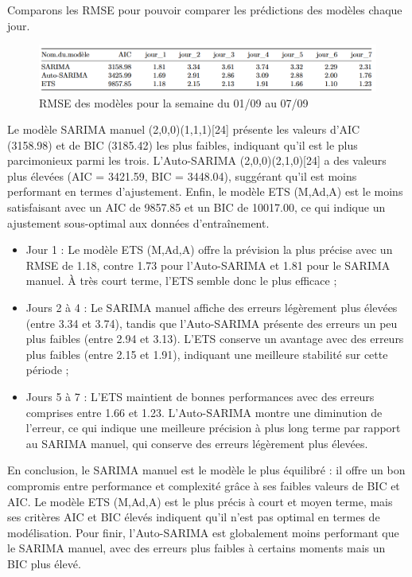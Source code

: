 \documentclass{article}
\theoremstyle{definition}
\theoremstyle{remark}
\begin{document}
\newpage
Comparons les RMSE pour pouvoir comparer les prédictions des modèles chaque jour.
\FloatBarrier
\begin{figure}[!h]
    \centering
    \includegraphics[width=1\linewidth]{fig20.png}
    \caption{RMSE des modèles pour la semaine du 01/09 au 07/09}
    \label{fig:enter-label}
\end{figure}
Le mod\`ele SARIMA manuel (2,0,0)(1,1,1)[24] pr\'esente les valeurs d'AIC (3158.98) et de BIC (3185.42) les plus faibles, indiquant qu'il est le plus parcimonieux parmi les trois. L'Auto-SARIMA (2,0,0)(2,1,0)[24] a des valeurs plus \'elev\'ees (AIC = 3421.59, BIC = 3448.04), sugg\'erant qu'il est moins performant en termes d'ajustement. Enfin, le mod\`ele ETS (M,Ad,A) est le moins satisfaisant avec un AIC de 9857.85 et un BIC de 10017.00, ce qui indique un ajustement sous-optimal aux donn\'ees d’entra\^inement.

\begin{itemize}
    \item Jour 1 : Le mod\`ele ETS (M,Ad,A) offre la pr\'evision la plus pr\'ecise avec un RMSE de 1.18, contre 1.73 pour l'Auto-SARIMA et 1.81 pour le SARIMA manuel. \`A tr\`es court terme, l'ETS semble donc le plus efficace ;
    \item Jours 2 \`a 4 : Le SARIMA manuel affiche des erreurs l\'eg\`erement plus \'elev\'ees (entre 3.34 et 3.74), tandis que l'Auto-SARIMA pr\'esente des erreurs un peu plus faibles (entre 2.94 et 3.13). L'ETS conserve un avantage avec des erreurs plus faibles (entre 2.15 et 1.91), indiquant une meilleure stabilit\'e sur cette p\'eriode ;
    \item Jours 5 \`a 7 : L'ETS maintient de bonnes performances avec des erreurs comprises entre 1.66 et 1.23. L'Auto-SARIMA montre une diminution de l'erreur, ce qui indique une meilleure pr\'ecision \`a plus long terme par rapport au SARIMA manuel, qui conserve des erreurs l\'eg\`erement plus \'elev\'ees.
\end{itemize}

En conclusion, le SARIMA manuel est le mod\`ele le plus \'equilibr\'e : il offre un bon compromis entre performance et complexit\'e gr\^ace \`a ses faibles valeurs de BIC et AIC. Le mod\`ele ETS (M,Ad,A) est le plus pr\'ecis \`a court et moyen terme, mais ses crit\`eres AIC et BIC \'elev\'es indiquent qu'il n'est pas optimal en termes de mod\'elisation. Pour finir, l'Auto-SARIMA est globalement moins performant que le SARIMA manuel, avec des erreurs plus faibles \`a certains moments mais un BIC plus \'elev\'e.
\end{document}
